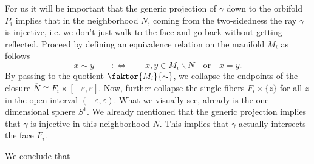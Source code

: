For us it will be important that the generic projection of \(\gamma\) down to the orbifold \(P_i\) implies that in the neighborhood \(N\), coming from the two-sidedness the ray \(\gamma\) is injective, i.e. we don't just walk to the face and go back without getting reflected. %
Proceed by defining an equivalence relation on the manifold \(M_i\) as follows
\begin{equation*}
    x \sim y  \qquad :\iff \qquad x, y \in M_i \backslash N \quad\text{or}\quad x = y.
\end{equation*}
By passing to the quotient \(\faktor{M_i}{\sim}\), we collapse the endpoints of the closure \(\overline{N} \cong F_i \times [-\varepsilon, \varepsilon]\).
Now, further collapse the single fibers \(F_i \times \{z\}\) for all \(z\) in the open interval \((-\varepsilon, \varepsilon)\).
What we visually see, already is the one-dimensional sphere \(S^1\).
We already mentioned that the generic projection implies that \(\gamma\) is injective in this neighborhood \(N\).
This implies that \(\gamma\) actually intersects the face \(F_i\).

We conclude that 
